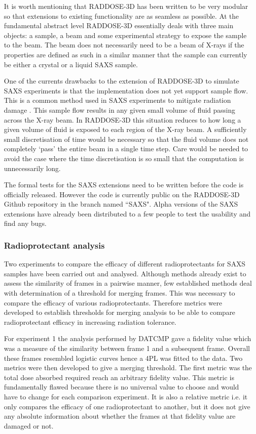It is worth mentioning that RADDOSE-3D has been written to be very modular so that extensions to existing functionality are as seamless as possible.
At the fundamental abstract level RADDOSE-3D essentially deals with three main objects: a sample, a beam and some experimental strategy to expose the sample to the beam.
The beam does not necessarily need to be a beam of X-rays if the properties are defined as such in a similar manner that the sample can currently be either a crystal or a liquid SAXS sample.

One of the currents drawbacks to the extension of RADDOSE-3D to simulate SAXS experiments is that the implementation does not yet support sample flow.
This is a common method used in SAXS experiments to mitigate radiation damage \cite{jeffries2015limiting}.
This sample flow results in any given small volume of fluid passing across the X-ray beam.
In RADDOSE-3D this situation reduces to how long a given volume of fluid is exposed to each region of the X-ray beam.
A sufficiently small discretisation of time would be necessary so that the fluid volume does not completely `pass' the entire beam in a single time step.
Care would be needed to avoid the case where the time discretisation is so small that the computation is unnecessarily long.

The formal tests for the SAXS extensions need to be written before the code is officially released.
However the code is currently public on the RADDOSE-3D Github repository in the branch named ``SAXS".
Alpha versions of the SAXS extensions have already been distributed to a few people to test the usability and find any bugs.

\subsubsection{Radioprotectant analysis}
\label{subs:Radioprotectant analysis}
Two experiments to compare the efficacy of different radioprotectants for SAXS samples have been carried out and analysed.
Although methods already exist to assess the similarity of frames in a pairwise manner, few established methods deal with determination of a threshold for merging frames.
This was necessary to compare the efficacy of various radioprotectants.
Therefore metrics were developed to establish thresholds for merging analysis to be able to compare radioprotectant efficacy in increasing radiation tolerance.

For experiment 1 the analysis performed by DATCMP gave a fidelity value which was a measure of the similarity between frame 1 and a subsequent frame.
Overall these frames resembled logistic curves hence a 4PL was fitted to the data.
Two metrics were then developed to give a merging threshold. The first metric was the total dose absorbed required reach an arbitrary fidelity value.
This metric is fundamentally flawed because there is no universal value to choose and would have to change for each comparison experiment.
It is also a relative metric i.e. it only compares the efficacy of one radioprotectant to another, but it does not give any absolute information about whether the frames at that fidelity value are damaged or not.

